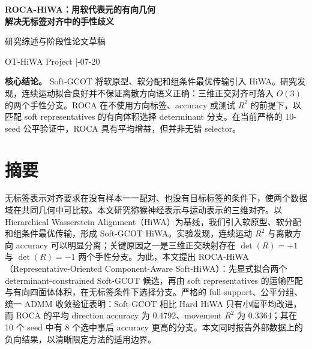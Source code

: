 \documentclass[UTF8,a4paper,11pt]{ctexart}
\begin{document}
\begin{center}
\end{center}

\begin{center}
{\Huge\bfseries\color{navy} ROCA-HiWA：用软代表元的有向几何\\[0.25em]解决无标签对齐中的手性歧义\par}
\vspace{0.65em}
{\large 研究综述与阶段性论文草稿}\par
\vspace{0.4em}
{\small OT-HiWA Project \quad|-07-20}
\end{center}

\vspace{0.8em}
\noindent\colorbox{softgray}{\parbox{0.965\linewidth}{\textbf{核心结论。} Soft-GCOT 将软原型、软分配和组条件最优传输引入 HiWA。研究发现，连续运动拟合良好并不保证离散方向语义正确：三维正交对齐可落入 $O(3)$ 的两个手性分支。ROCA 在不使用方向标签、accuracy 或测试 $R^2$ 的前提下，以匹配 soft representatives 的有向体积选择 determinant 分支。在当前严格的 10-seed 公平验证中，ROCA 具有平均增益，但并非无错 selector。}}

\section*{摘要}
无标签表示对齐要求在没有样本一一配对、也没有目标标签的条件下，使两个数据域在共同几何中可比较。本文研究猕猴神经表示与运动表示的三维对齐。以 Hierarchical Wasserstein Alignment（HiWA）为基线，我们引入软原型、软分配和组条件最优传输，形成 Soft-GCOT HiWA。实验发现，连续运动 $R^2$ 与离散方向 accuracy 可以明显分离；关键原因之一是三维正交映射存在 $\det(R)=+1$ 与 $\det(R)=-1$ 两个手性分支。为此，本文提出 ROCA-HiWA（Representative-Oriented Component-Aware Soft-HiWA）：先显式拟合两个 determinant-constrained Soft-GCOT 候选，再由 soft representatives 的运输匹配与有向四面体体积，在无标签条件下选择分支。严格的 full-support、公平分组、统一 ADMM 收敛验证表明：Soft-GCOT 相比 Hard HiWA 只有小幅平均改进，而 ROCA 的平均 direction accuracy 为 0.4792、movement $R^2$ 为 0.3364；其在 10 个 seed 中有 8 个选中事后 accuracy 更高的分支。本文同时报告外部数据上的负向结果，以清晰限定方法的适用边界。
\end{document}

